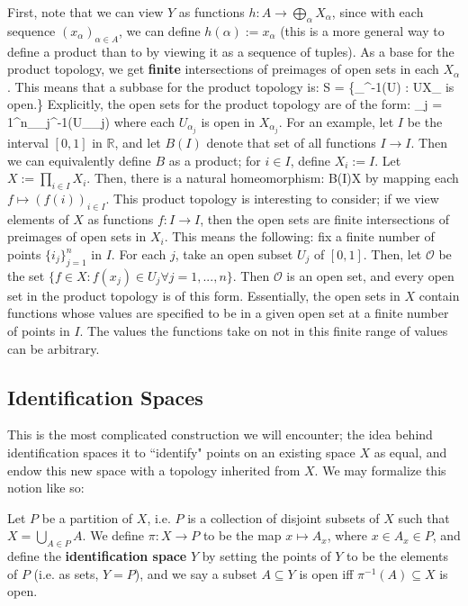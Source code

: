 	First, note that we can view $Y$ as functions $h : A\rightarrow\bigoplus_\alpha X_\alpha$, since with each sequence $(x_\alpha)_{\alpha\in A}$, we can 
	define $h(\alpha) := x_\alpha$ (this is a more general way to define a product than to by viewing it as a sequence of tuples). As a base for the product 
	topology, we get \textbf{finite} intersections of preimages of open sets in each $X_\alpha$. This means that a subbase for the product topology is:
	\eq
		S = \{\pi_\alpha^{-1}(U) : U\subseteq X_\alpha\textnormal{ is open.}\}
	\qe
	Explicitly, the open sets for the product topology are of the form:
	\eq
		\bigcap_{j = 1}^n\pi_{\alpha_j}^{-1}(U_{\alpha_j})
	\qe
	where each $U_{\alpha_j}$ is open in $X_{\alpha_j}$. For an example, let $I$ be the interval $[0, 1]$ in $\mathbb R$, and let $B(I)$ denote that 
	set of all functions $I\rightarrow I$. Then we can equivalently define $B$ as a product; for $i\in I$, define $X_i := I$. Let $X := \prod_{i\in I} X_i$. Then, there is a 
	natural homeomorphism:
	\eq
		B(I)\xrightarrow{\sim}X
	\qe
	by mapping each $f\mapsto (f(i))_{i\in I}$. This product topology is interesting to consider; if we view elements of $X$ as functions $f : I\rightarrow I$, then 
	the open sets are finite intersections of preimages of open sets in $X_i$. This means the following: fix a finite number of points $\{i_j\}_{j = 1}^n$ in $I$. 
	For each $j$, take an open subset $U_j$ of $[0, 1]$. Then, let $\mathcal O$ be the set $\{f\in X : f(x_j) \in U_j\forall j = 1, ..., n\}$. Then $\mathcal O$ is an 
	open set, and every open set in the product topology is of this form. Essentially, the open sets in $X$ contain functions whose values are specified to be in 
	a given open set at a finite number of points in $I$. The values the functions take on not in this finite range of values can be arbitrary.
	
	\subsection{Identification Spaces}
	
	This is the most complicated construction we will encounter; the idea behind identification spaces it to ``identify" points on an existing space $X$ as equal, 
	and endow this new space with a topology inherited from $X$. We may formalize this notion like so:
	
	\begin{definition}
		Let $P$ be a partition of $X$, i.e. $P$ is a collection of disjoint subsets of $X$ such that $X = \bigcup_{A\in P}A$. We define $\pi : X\rightarrow P$ to be 
		the map $x\mapsto A_x$, where $x\in A_x\in P$, and define the \textbf{identification space} $Y$ by setting the points of $Y$ to be the elements of $P$ 
		(i.e. as sets, $Y = P$), and we say a subset $A\subseteq Y$ is open iff $\pi^{-1}(A)\subseteq X$ is open.
	\end{definition}
	
